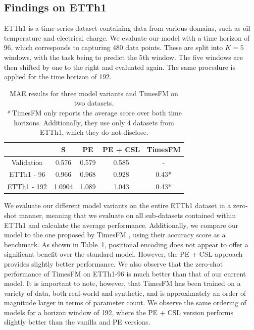 \documentclass{article}
\theoremstyle{plain}
\theoremstyle{definition}
\theoremstyle{remark}
\begin{document}
\subsection{Findings on ETTh1}
ETTh1 is a time series dataset containing data from various domains, such as oil temperature and electrical charge. We evaluate our model with a time horizon of 96, which corresponds to capturing 480 data points. These are split into $K=5$ windows, with the task being to predict the 5th window. 
The five windows are then shifted by one to the right and evaluated again.
The same procedure is applied for the time horizon of 192.
\begin{table}[h!]
    \centering
    \begin{tabular}{|c|c|c|c|c|}
    \hline
    \textbf{} & S & PE & PE + CSL & TimesFM \\ \hline 
    Validation   & 0.576             & 0.579             & 0.585             & -       \\ \hline
    ETTh1 - 96   & 0.966             & 0.968            & 0.928      &0.43*             \\ \hline
    ETTh1 - 192  & 1.0904            & 1.089            & 1.043            & 0.43*                     \\ \hline

\end{tabular}
    \caption{MAE results for three model variants and TimesFM on two datasets.\\
    \textit{*} TimesFM \cite{das2024decoderonlyfoundationmodeltimeseries} only reports the average score over both time horizons. Additionally, they use only 4 datasets from ETTh1, which they do not disclose.
    }
    \label{tab:evaluation_results}
\end{table}
We evaluate our different model variants on the entire ETTh1 dataset in a zero-shot manner, meaning that we evaluate on all sub-datasets contained within ETTh1 and calculate the average performance.
Additionally, we compare our model to the one proposed by TimesFM \cite{das2024decoderonlyfoundationmodeltimeseries}, using their accuracy score as a benchmark.
As shown in Table~\ref{tab:evaluation_results}, positional encoding does not appear to offer a significant benefit over the standard model. However, the PE + CSL approach provides slightly better performance. We also observe that the zero-shot performance of TimesFM on ETTh1-96 is much better than that of our current model. It is important to note, however, that TimesFM has been trained on a variety of data, both real-world and synthetic, and is approximately an order of magnitude larger in terms of parameter count.
We observe the same ordering of models for a horizon window of 192, where the PE + CSL version performs slightly better than the vanilla and PE versions.
\end{document}
